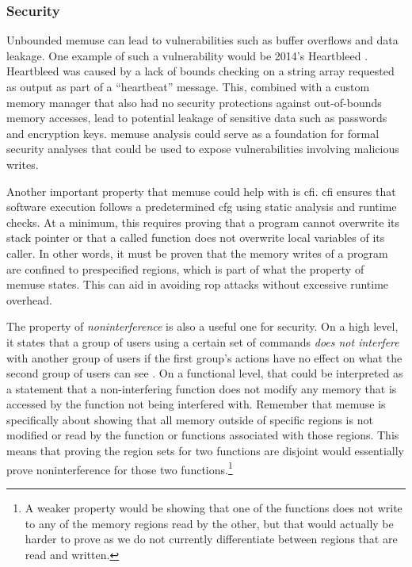 \subsubsection{Security}
Unbounded \gls{memuse} can lead to vulnerabilities such as buffer overflows and data leakage.
One example of such a vulnerability would be 2014's Heartbleed \autocite{heartbleed}.
Heartbleed was caused by a lack of bounds checking on a string array requested as output as part of a ``heartbeat'' message.
This, combined with a custom memory manager that also had no security protections against out-of-bounds memory accesses, lead to potential leakage of sensitive data such as passwords and encryption keys.
\Gls{memuse} analysis could serve as a foundation for formal security analyses that could be used to expose vulnerabilities involving malicious writes.

Another important property that \gls{memuse} could help with is \gls{cfi}.
\Gls{cfi} ensures that software execution follows a predetermined \gls{cfg} using static analysis and runtime checks.
At a minimum, this requires proving that a program cannot overwrite its stack pointer or that a called function does not overwrite local variables of its caller.
In other words, it must be proven that the memory writes of a program are confined to prespecified regions, which is part of what the property of \gls{memuse} states.
This can aid in avoiding \gls{rop} attacks without excessive runtime overhead.

The property of \emph{noninterference} is also a useful one for security.
On a high level, it states that a group of users using a certain set of commands \emph{does not interfere} with another group of users if the first group's actions have no effect on what the second group of users can see
\autocite{goguen1982security,rushby1992noninterference}.
On a functional level, that could be interpreted as a statement that a non-interfering function does not modify any memory that is accessed by the function not being interfered with.
Remember that \gls{memuse} is specifically about showing that all memory outside of specific regions is not modified or read by the function or functions associated with those regions.
This means that proving the region sets for two functions are disjoint would essentially prove noninterference for those two functions.\footnote{%
  A weaker property would be showing that one of the functions does not write
  to any of the memory regions read by the other, but that would actually be harder to prove as we do not currently differentiate between regions that are read and written.%
}

